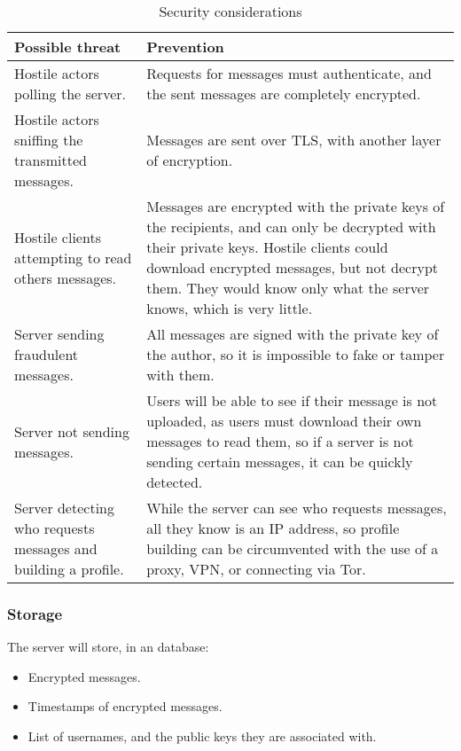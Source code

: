 \documentclass{article}
\begin{document}
\begin{table}[H]
    \centering
    \caption{Security considerations}
    \vspace{0.2cm}
    \begin{tabular}{p{}p{}}
    \toprule
    \textbf{Possible threat} & \textbf{Prevention}\\
    \midrule
    Hostile actors polling the server. & Requests for messages must authenticate, and the sent messages are completely encrypted.\\
    \midrule
    Hostile actors sniffing the transmitted messages. & Messages are sent over TLS, with another layer of encryption.\\
    \midrule
    Hostile clients attempting to read others messages. & Messages are encrypted with the private keys of the recipients, and can only be decrypted with their private keys. Hostile clients could download encrypted messages, but not decrypt them. They would know only what the server knows, which is very little.\\
    \midrule
    Server sending fraudulent messages. & All messages are signed with the private key of the author, so it is impossible to fake or tamper with them.\\
    \midrule
    Server not sending messages. & Users will be able to see if their message is not uploaded, as users must download their own messages to read them, so if a server is not sending certain messages, it can be quickly detected.\\
    \midrule
    Server detecting who requests messages and building a profile. & While the server can see who requests messages, all they know is an IP address, so profile building can be circumvented with the use of a proxy, VPN, or connecting via Tor.\\
    \bottomrule
    \end{tabular}
    \label{tab:secconsrecv}
\end{table}
\subsubsection{Storage}
The server will store, in an database:
\begin{itemize}
    \item Encrypted messages.
    \item Timestamps of encrypted messages.
    \item List of usernames, and the public keys they are associated with.
\end{itemize}
\end{document}
